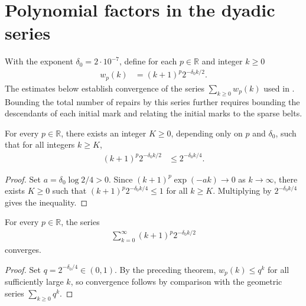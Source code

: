 \section{Polynomial factors in the dyadic series}
\label{sec:area_law_polynomial_decay}

With the exponent $\delta_0=2\cdot10^{-7}$, define for each $p\in\mathbb R$
and integer $k\ge0$
\begin{align}
    w_p(k) & =(k+1)^p2^{-\delta_0 k/2}.
\end{align}
The estimates below establish convergence of the series $\sum_{k\ge0}w_p(k)$
used in \cite[Section~11]{OpenAI2026AreaLaw}. Bounding the total number of
repairs by this series further requires bounding the descendants of each
initial mark and relating the initial marks to the sparse belts.


\begin{lemma}
    \label{thm:area_law_polynomial_absorption}
    \leanok
    For every $p\in\mathbb R$, there exists an integer $K\ge0$, depending only
    on $p$ and $\delta_0$, such that for all integers $k\ge K$,
    \begin{align}
        (k+1)^p2^{-\delta_0 k/2} & \le2^{-\delta_0 k/4}.
    \end{align}
\end{lemma}
\begin{proof}\leanok
    Set $a=\delta_0\log2/4>0$. Since $(k+1)^p\exp(-ak)\to0$ as $k\to\infty$,
    there exists $K\ge0$ such that $(k+1)^p2^{-\delta_0 k/4}\le1$ for all
    $k\ge K$. Multiplying by $2^{-\delta_0 k/4}$ gives the inequality.
\end{proof}

\begin{lemma}
    \label{thm:area_law_polynomial_summability}
    \leanok
    For every $p\in\mathbb R$, the series
    \begin{align}
        \sum_{k=0}^{\infty}(k+1)^p2^{-\delta_0 k/2}
    \end{align}
    converges.
\end{lemma}
\begin{proof}\leanok
    Set $q=2^{-\delta_0/4}\in(0,1)$. By the preceding theorem,
    $w_p(k)\le q^k$ for all sufficiently large $k$, so convergence follows by
    comparison with the geometric series $\sum_{k\ge0}q^k$.
\end{proof}

